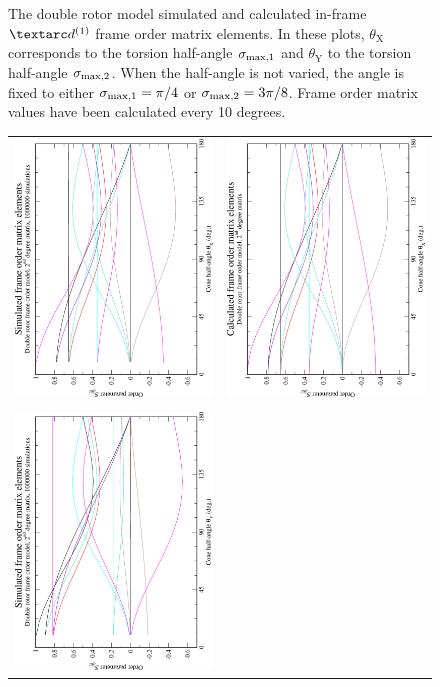 \begin{figure}
\begin{tabular}{@{}cc@{}}
  \end{tabular}
  \caption[Double rotor simulated and calculated in-frame Daeg$^{(1)}$ elements.]{
    The double rotor model simulated and calculated in-frame $\FOone$ frame order matrix elements.
    In these plots, $\theta_\textrm{X}$ corresponds to the torsion half-angle $\sigma_{\textrm{max,1}}$ and $\theta_\textrm{Y}$ to the torsion half-angle $\sigma_{\textrm{max,2}}$.
    When the half-angle is not varied, the angle is fixed to either $\sigma_{\textrm{max,1}} = \pi/4$ or $\sigma_{\textrm{max,2}} = 3\pi/8$.
    Frame order matrix values have been calculated every 10 degrees.
  }
  \label{fig: simulated and calculated in-frame 1st degree double rotor frame order}
\end{figure}

\begin{figure}
\centering
  \begin{tabular}{@{}cc@{}}
    \includegraphics[width=.35\textwidth,angle=270]{images/frame_order_matrix/Sijkl_double_rotor_in_frame_theta_x_ens1000000.eps} &
    \includegraphics[width=.35\textwidth,angle=270]{images/frame_order_matrix/Sijkl_double_rotor_in_frame_theta_x_calc.eps} \\
    \\[-5pt]
    \includegraphics[width=.35\textwidth,angle=270]{images/frame_order_matrix/Sijkl_double_rotor_in_frame_theta_y_ens1000000.eps} &

\end{tabular}
\end{figure}
